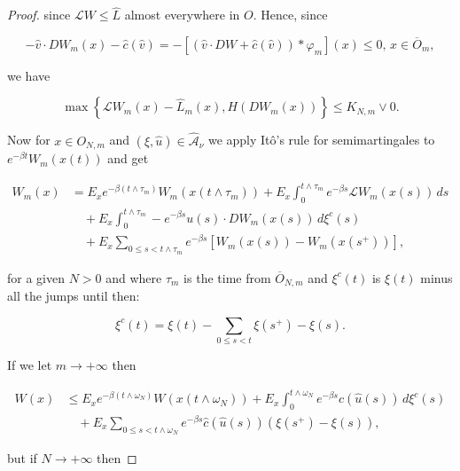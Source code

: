 \begin{theorem}
\begin{proof}
        since $\mathcal{L}W\leq \hat{L}$ almost everywhere in $O$. Hence, since

        \[-\hat{v}\cdot DW_m(x) - \hat{c}(\hat{v}) = - [(\hat{v}\cdot DW + \hat{c}(\hat{v}))\ast\varphi_m](x)\leq0,\,x\in\overline{O}_m,\]

        we have
        
        \begin{equation}
            \max\left\{\mathcal{L}W_m(x) - \hat{L}_m(x), H(DW_m(x))\right\} \leq K_{N,m}\lor 0.
        \end{equation}

        Now for $x\in O_{N,m}$ and $(\xi,\hat{u})\in\hat{\mathcal{A}}_{\nu}$ we apply It\^o's rule for semimartingales \cite{guo2022itosformulaflowsmeasures} to $e^{-\beta t}W_m(x(t))$ and get

        \begin{equation*}
            \begin{aligned}
                W_m(x) & = E_x e^{-\beta(t\land \tau_m)} W_m(x(t\land\tau_m)) + E_x\int_0^{t\land\tau_m} e^{-\beta s}\mathcal{L}W_m(x(s))\,ds \\
                & \quad + E_x\int_0^{t\land\tau_m} -e^{-\beta s} u(s)\cdot DW_m(x(s)) \, d\xi^c(s) \\
                & \quad + E_x \sum_{0\leq s< t\land\tau_m} e^{-\beta s}[W_m(x(s)) - W_m(x(s^+))],
            \end{aligned}
        \end{equation*}

        for a given $N>0$ and where $\tau_m$ is the time from $\overline{O}_{N,m}$ and $\xi^c(t)$ is $\xi(t)$ minus all the jumps until then:

        \[ \xi^c(t) = \xi(t) - \sum_{0\leq s < t} \xi(s^+) - \xi(s).\]

        If we let $m\to+\infty$ then

        \begin{equation*}
            \begin{aligned}
                W(x) & \leq E_x e^{-\beta (t\land\omega_N)} W(x(t\land \omega_N)) + E_x\int_0^{t\land \omega_N} e^{-\beta s}\hat{c}(\hat{u}(s))\,d\xi^c(s) \\
                & \quad + E_x \sum_{0\leq s <t\land\omega_N} e^{-\beta s}\hat{c}(\hat{u}(s)) (\xi(s^+) - \xi(s)),
            \end{aligned}
        \end{equation*}

        but if $N\to+\infty$ then


\end{proof}
\end{theorem}
